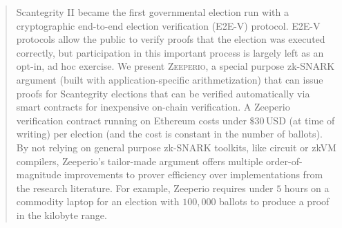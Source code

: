 \begin{abstract}

Scantegrity II became the first governmental election run with a cryptographic end-to-end election verification (E2E-V) protocol. 
E2E-V protocols allow the public to verify proofs that the election was executed correctly, but participation in this important process is largely left as an opt-in, ad hoc exercise. 
We present \textsc{Zeeperio}, a special purpose zk-SNARK argument (built with application-specific arithmetization) that can issue proofs for Scantegrity elections that can be verified automatically via smart contracts for inexpensive on-chain verification.
A Zeeperio verification contract running on Ethereum costs under $\$30\,$USD (at time of writing) per election (and the cost is constant in the number of ballots).
By not relying on general purpose zk-SNARK toolkits, like circuit or zkVM compilers, Zeeperio's tailor-made argument offers multiple order-of-magnitude improvements to prover efficiency over implementations from the research literature. For example, Zeeperio requires under $5$ hours on a commodity laptop for an election with $100{,}000$ ballots to produce a proof in the kilobyte range. 







\end{abstract}